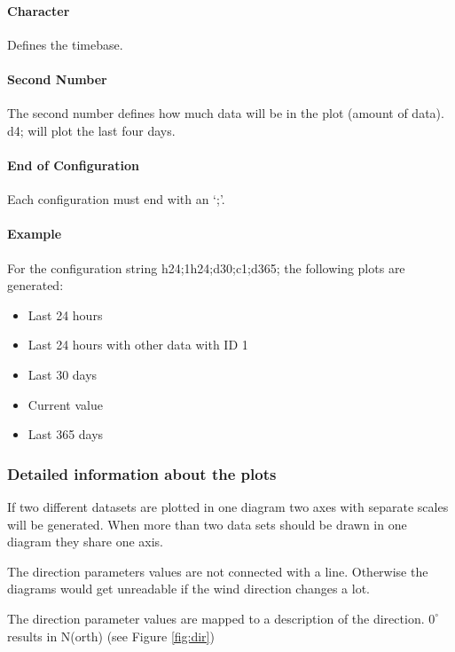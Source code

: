 \paragraph{Character} %
\label{par:character}
Defines the timebase.
\paragraph{Second Number} %
\label{par:number}
The second number defines how much data will be in the plot (amount of data). {\C d4;} will plot the last four days.
\paragraph{End of Configuration} %
\label{par:end_of_configuration}
Each configuration must end with an {\C `;'}.

\paragraph{Example} %
\label{par:example}
For the configuration string {\C h24;1h24;d30;c1;d365;} the following plots are generated:
\begin{itemize}
	\item Last 24 hours
	\item Last 24 hours with other data with ID 1 
	\item Last 30 days
	\item Current value
	\item Last 365 days
\end{itemize}


\subsubsection{Detailed information about the plots} %
\label{ssub:detailed_information_about_the_plots}
If two different datasets are plotted in one diagram two axes with separate scales will be generated. When more than two data sets should be drawn in one diagram they share one axis.

The direction parameters values are not connected with a line. Otherwise the diagrams would get unreadable if the wind direction changes a lot.

The direction parameter values are mapped to a description of the direction. $0^\circ$ results in N(orth) (see Figure \ref{fig:dir})


